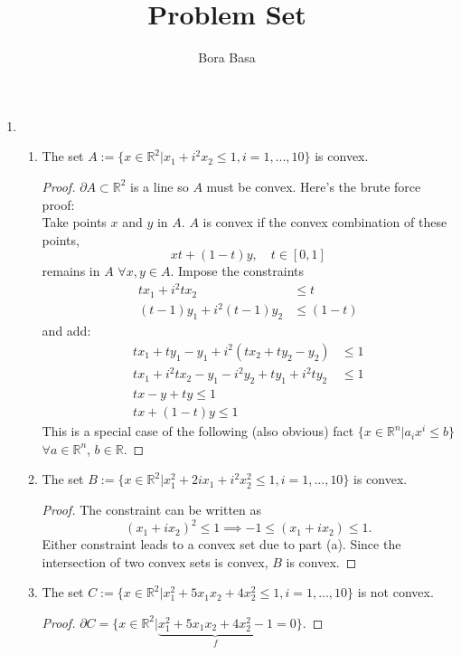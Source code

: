 \documentclass[12pt]{article}
\title{Problem Set \HWNO}
\author{Bora Basa}
\newcommand{\CLASS}{STAT 525}
\newcommand{\HWNO}{1}
\begin{document}
\begin{enumerate}
    \item \begin{enumerate}
        \item The set $A:=\{x\in\mathbb R^2| x_1+i^2x_2\leq 1, i=1,...,10\}$ is convex.
        \begin{proof}
            $\partial A\subset \mathbb R^2$ is a line so $A$ must be convex. Here's the brute force proof:\\ 
            Take points $x$ and $y$ in $A$. $A$ is convex if the convex combination of these points,
            $$
                xt+(1-t)y,\quad t\in[0,1]
            $$
            remains in $A$ $\forall x,y\in A$. Impose the constraints
            \begin{align*}
            tx_1+i^2tx_2&\leq t\\
            (t-1)y_1+i^2(t-1)y_2&\leq (1-t)
            \end{align*}
            and add:
            \begin{align*}
            tx_1+ty_1-y_1+i^2(tx_2+ty_2-y_2)&\leq 1\\
            tx_1+i^2tx_2-y_1-i^2y_2+ty_1+i^2ty_2&\leq 1\\
            tx-y+ty\leq 1\\
            tx+(1-t)y\leq 1
            \end{align*}
            This is a special case of the following (also obvious) fact $\{x\in\mathbb R^n|a_ix^i\leq b\}$ $\forall a\in\mathbb R^{n}$, $b\in \mathbb R$.
        \end{proof}
        \item  The set $B:=\{x\in\mathbb R^2| x_1^2+2ix_1+i^2x_2^2\leq 1, i=1,...,10\}$ is convex.
         \begin{proof}
            The constraint can be written as 
            $$
            (x_1+ix_2)^2\leq 1\implies -1\leq(x_1+ix_2)\leq 1.
            $$
            Either constraint leads to a convex set due to part (a). Since the intersection of two convex sets is convex, $B$ is convex.
        \end{proof}
        \item  The set $C:=\{x\in\mathbb R^2| x_1^2+5x_1x_2+4x_2^2\leq 1, i=1,...,10\}$ is not convex.
        \begin{proof}
            $\partial C=\{x\in\mathbb R^2|  \underbrace{x_1^2+5x_1x_2+4x_2^2-1}_f=0\}$. 
            

\end{proof}
\end{enumerate}
\end{enumerate}
\end{document}
